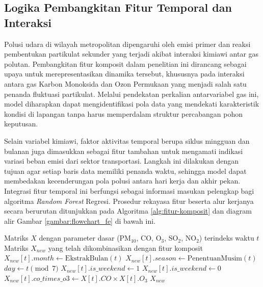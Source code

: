 \subsection{Logika Pembangkitan Fitur Temporal dan Interaksi}

Polusi udara di wilayah metropolitan dipengaruhi oleh emisi primer dan reaksi pembentukan partikulat sekunder yang terjadi akibat interaksi kimiawi antar gas polutan. Pembangkitan fitur komposit dalam penelitian ini dirancang sebagai upaya untuk merepresentasikan dinamika tersebut, khususnya pada interaksi antara gas Karbon Monoksida dan Ozon Permukaan yang menjadi salah satu penanda fluktuasi partikulat. Melalui pendekatan perkalian antarvariabel gas ini, model diharapkan dapat mengidentifikasi pola data yang mendekati karakteristik kondisi di lapangan tanpa harus memperdalam struktur percabangan pohon keputusan.

Selain variabel kimiawi, faktor aktivitas temporal berupa siklus mingguan dan bulanan juga dimasukkan sebagai fitur tambahan untuk mengamati indikasi variasi beban emisi dari sektor transportasi. Langkah ini dilakukan dengan tujuan agar setiap baris data memiliki penanda waktu, sehingga model dapat membedakan kecenderungan pola polusi antara hari kerja dan akhir pekan. Integrasi fitur temporal ini berfungsi sebagai informasi masukan pelengkap bagi algoritma \textit{Random Forest} Regresi. Prosedur rekayasa fitur beserta alur kerjanya secara berurutan ditunjukkan pada Algoritma \ref{alg:fitur-komposit} dan diagram alir Gambar \ref{gambar:flowchart_fe} di bawah ini.

\begin{algorithm}[htbp]
\caption{Pembangkitan Fitur Interaksi dan Temporal}
\label{alg:fitur-komposit}
\begin{algorithmic}[1] 
\Require Matriks $X$ dengan parameter dasar ($\text{PM}_{10}$, $\text{CO}$, $\text{O}_3$, $\text{SO}_2$, $\text{NO}_2$) terindeks waktu $t$
\Ensure Matriks $X_{new}$ yang telah dikombinasikan dengan fitur komposit
    \State $X_{new}[t].month \gets \text{EkstrakBulan}(t)$
    \State $X_{new}[t].season \gets \text{PenentuanMusim}(t)$
    \State $day \gets t \pmod 7$
        \State $X_{new}[t].is\_weekend \gets 1$
    \Else
        \State $X_{new}[t].is\_weekend \gets 0$
    \EndIf
    \State $X_{new}[t].co\_times\_o3 \gets X[t].CO \times X[t].O_3$
\EndFor
\State \Return $X_{new}$
\end{algorithmic}
\end{algorithm}

